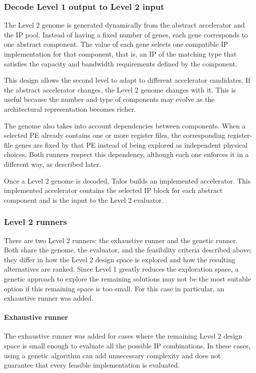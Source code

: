 \subsubsection{Decode Level 1 output to Level 2 input}
The Level 2 genome is generated dynamically from the abstract
accelerator and the IP pool. Instead of having a fixed number of
genes, each gene corresponds to one abstract component. The value of
each gene selects one compatible IP implementation for that component,
that is, an IP of the matching type that satisfies the capacity and
bandwidth requirements defined by the component.

This design allows the second level to adapt to different accelerator
candidates. If the abstract accelerator changes, the Level 2 genome
changes with it. This is useful because the number and type of
components may evolve as the architectural representation becomes
richer.

The genome also takes into account dependencies between components.
When a selected PE already contains one or more register files, the
corresponding register-file genes are fixed by that PE instead of
being explored as independent physical choices. Both runners respect
this dependency, although each one enforces it in a different way, as
described later.

Once a Level 2 genome is decoded, Talos builds an implemented
accelerator. This implemented accelerator contains the selected IP
block for each abstract component and is the input to the Level 2
evaluator.


\subsubsection{Level 2 runners}
There are two Level 2 runners: the exhaustive runner and the genetic
runner. Both share the genome, the evaluator, and the feasibility
criteria described above; they differ in how the Level 2 design space
is explored and how the resulting alternatives are ranked. Since Level
1 greatly reduces the exploration space, a genetic approach to explore
the remaining solutions may not be the most suitable option if this
remaining space is too small. For this case in particular, an
exhaustive runner was added.

\paragraph{Exhaustive runner}
The exhaustive runner was added for cases where the remaining Level 2
design space is small enough to evaluate all the possible IP
combinations. In these cases, using a genetic algorithm can add
unnecessary complexity and does not guarantee that every feasible
implementation is evaluated.


